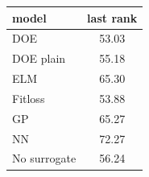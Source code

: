 \begin{tabular}{|lc|}
\hline
model & last rank\\
\hline
DOE & 53.03 \\
DOE plain & 55.18 \\
ELM & 65.30 \\
Fitloss & 53.88 \\
GP & 65.27 \\
NN & 72.27 \\
No surrogate & 56.24 \\
\hline
\end{tabular}
